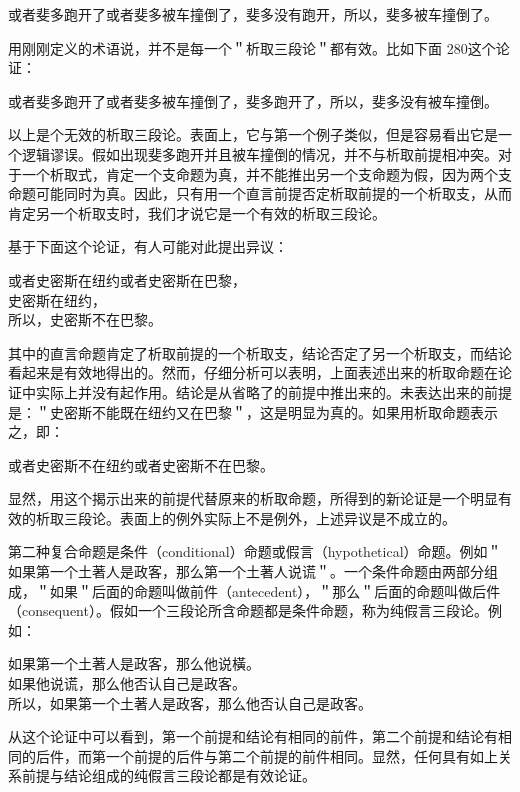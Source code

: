 \begin{displayquote}
或者斐多跑开了或者斐多被车撞倒了，斐多没有跑开，所以，斐多被车撞倒了。
\end{displayquote}

用刚刚定义的术语说，并不是每一个＂析取三段论＂都有效。比如下面 280这个论证：

\begin{displayquote}
或者斐多跑开了或者斐多被车撞倒了，斐多跑开了，所以，斐多没有被车撞倒。
\end{displayquote}

以上是个无效的析取三段论。表面上，它与第一个例子类似，但是容易看出它是一个逻辑谬误。假如出现斐多跑开并且被车撞倒的情况，并不与析取前提相冲突。对于一个析取式，肯定一个支命题为真，并不能推出另一个支命题为假，因为两个支命题可能同时为真。因此，只有用一个直言前提否定析取前提的一个析取支，从而肯定另一个析取支时，我们才说它是一个有效的析取三段论。

基于下面这个论证，有人可能对此提出异议：

或者史密斯在纽约或者史密斯在巴黎，\\
史密斯在纽约，\\
所以，史密斯不在巴黎。

其中的直言命题肯定了析取前提的一个析取支，结论否定了另一个析取支，而结论看起来是有效地得出的。然而，仔细分析可以表明，上面表述出来的析取命题在论证中实际上并没有起作用。结论是从省略了的前提中推出来的。未表达出来的前提是：＂史密斯不能既在纽约又在巴黎＂，这是明显为真的。如果用析取命题表示之，即：

或者史密斯不在纽约或者史密斯不在巴黎。

显然，用这个揭示出来的前提代替原来的析取命题，所得到的新论证是一个明显有效的析取三段论。表面上的例外实际上不是例外，上述异议是不成立的。

第二种复合命题是条件（conditional）命题或假言（hypothetical）命题。例如＂如果第一个土著人是政客，那么第一个土著人说谎＂。一个条件命题由两部分组成，＂如果＂后面的命题叫做前件（antecedent），＂那么＂后面的命题叫做后件（consequent）。假如一个三段论所含命题都是条件命题，称为纯假言三段论。例如：

如果第一个土著人是政客，那么他说橫。\\
如果他说谎，那么他否认自己是政客。\\
所以，如果第一个土著人是政客，那么他否认自己是政客。

从这个论证中可以看到，第一个前提和结论有相同的前件，第二个前提和结论有相同的后件，而第一个前提的后件与第二个前提的前件相同。显然，任何具有如上关系前提与结论组成的纯假言三段论都是有效论证。

